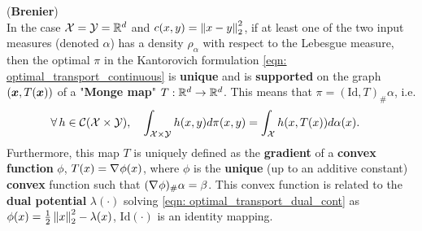 \documentclass[11pt]{article}
\begin{document}
\begin{theorem} (\textbf{Brenier})\\ 
In the case ${\mathcal X} = {\mathcal Y} = {\mathbb R}^d$ and $c(x, y) = \left\|x -y\right\|_{2}^2$, if at least one of the two input measures (denoted $\alpha$) has a density $\rho_{\alpha}$ with respect to
the Lebesgue measure, then the optimal $\pi$ in the Kantorovich formulation \eqref{eqn: optimal_transport_continuous} is \textbf{unique} and is \textbf{supported} on the graph $(\boldsymbol{x}, T(\boldsymbol{x}))$ of a "\textbf{Monge map}" $T : {\mathbb R}^d \rightarrow {\mathbb R}^d$. This means that $\pi = (\text{Id}, T)_{\#}\alpha$, i.e. 
\begin{align}
\forall\, h\in {\mathcal C}({\mathcal X} \times {\mathcal Y}), \quad \int_{{\mathcal X} \times {\mathcal Y}} h (x, y) d\pi(x, y) &= \int_{{\mathcal X}} h(x, T(x)) d\alpha(x).  \label{eqn: Brenier_theorem}
\end{align} Furthermore, this map $T$ is uniquely defined as the \textbf{gradient} of a \textbf{convex function} $\phi$, $T(x) = \nabla_{}{\phi(x)}$, where $\phi$ is the \textbf{unique} (up to an additive constant) \textbf{convex} function such that $(\nabla_{}{\phi})_{\#}\alpha = \beta$. This convex function is related to the \textbf{dual potential} $\lambda(\cdot)$ solving \eqref{eqn: optimal_transport_dual_cont} as $\phi(x) = \frac{1}{2}\left\|x\right\|_{2}^2 - \lambda(x)$, $\text{Id}(\cdot)$ is an identity mapping.
\end{theorem}
\end{document}
